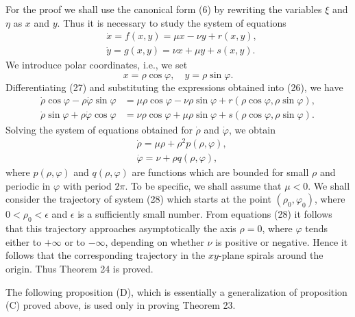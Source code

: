 \documentclass[10pt,a5paper]{book}
\makeatletter
\theoremstyle{plain}
\theoremstyle{definition}
\theoremstyle{remark}
\renewenvironment{proof}[1][\proofname]{\par
  \pushQED{\qed}%
  \normalfont\topsep6\p@\@plus6\p@\relax
  \trivlist
  \item\relax{\itshape #1\@addpunct{.}}\hspace\labelsep\ignorespaces
}{\popQED\endtrivlist\@endpefalse}
\makeatother
\begin{document}
\begin{proof}
For the proof we shall use the canonical form (6) by rewriting the variables $\xi$ and $\eta$ as $x$ and $y$. Thus it is necessary to study the system of equations
\begin{align*}
& \dot{x}=f(x, y)=\mu x-\nu y+r(x, y),  \tag{26}\\
& \dot{y}=g(x, y)=\nu x+\mu y+s(x, y) .
\end{align*}
We introduce polar coordinates, i.e., we set
\begin{equation*}
x=\rho \cos \varphi, \quad y=\rho \sin \varphi . \tag{27}
\end{equation*}
Differentiating (27) and substituting the expressions obtained into (26), we have
\[
\begin{aligned}
\dot{\rho} \cos \varphi-\rho \dot{\varphi} \sin \varphi & =\mu \rho \cos \varphi-\nu \rho \sin \varphi+r(\rho \cos \varphi, \rho \sin \varphi), \\
\dot{\rho} \sin \varphi+\rho \dot{\varphi} \cos \varphi & =\nu \rho \cos \varphi+\mu \rho \sin \varphi+s(\rho \cos \varphi, \rho \sin \varphi) .
\end{aligned}
\]
Solving the system of equations obtained for $\dot{\rho}$ and $\dot{\varphi}$, we obtain
\begin{align*}
& \dot{\rho}=\mu \rho+\rho^{2} p(\rho, \varphi), \\
& \dot{\varphi}=\nu+\rho q(\rho, \varphi), \tag{28}
\end{align*}
where $p(\rho, \varphi)$ and $q(\rho, \varphi)$ are functions which are bounded for small $\rho$ and periodic in $\varphi$ with period $2 \pi$. To be specific, we shall assume that $\mu<0$. We shall consider the trajectory of system (28) which starts at the point $\left(\rho_{0}, \varphi_{0}\right)$, where $0<\rho_{0}<\epsilon$ and $\epsilon$ is a sufficiently small number. From equations (28) it follows that this trajectory approaches asymptotically the axis $\rho=0$, where $\varphi$ tends either to $+\infty$ or to $-\infty$, depending on whether $\nu$ is positive or negative. Hence it follows that the corresponding trajectory in the $x y$-plane spirals around the origin. Thus Theorem 24 is proved.

The following proposition (D), which is essentially a generalization of proposition (C) proved above, is used only in proving Theorem 23.


\end{proof}
\end{document}
